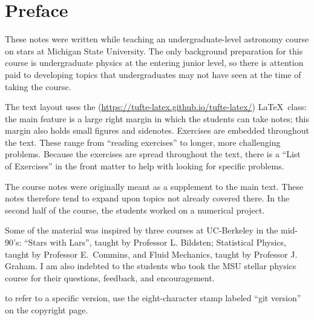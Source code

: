 
\section*{Preface}
These notes were written while teaching an undergraduate-level astronomy course on stars at Michigan State University.  The only background preparation for this course is undergraduate physics at the entering junior level, so there is attention paid to developing topics that undergraduates may not have seen at the time of taking the course.

The text layout uses the  (\url{https://tufte-latex.github.io/tufte-latex/}) \LaTeX\ class:  the main feature is a large right margin in which the students can take notes; this margin also holds small figures and sidenotes. Exercises are embedded throughout the text.  These range from ``reading exercises'' to longer, more challenging problems.  Because the exercises are spread throughout the text, there is a ``List of Exercises'' in the front matter to help with looking for specific problems.

The course notes were originally meant as a supplement to the main text.  These notes therefore tend to expand upon topics not already covered there.  In the second half of the course, the students worked on a numerical project.

Some of the material was inspired by three courses at UC-Berkeley in the mid-90's: ``Stars with Lars'', taught by Professor L. Bildsten; Statistical Physics, taught by Professor E.~Commins, and Fluid Mechanics, taught by Professor J. Graham.  I am also indebted to the students who took the MSU stellar physics course for their questions, feedback, and encouragement. 

 to refer to a specific version, use the eight-character stamp labeled ``git version'' on the copyright page.
